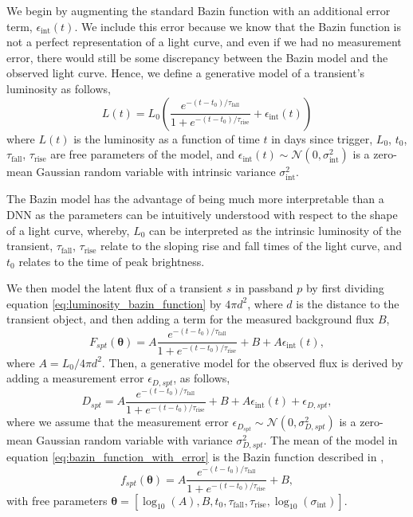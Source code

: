 \documentclass[fleqn,usenatbib]{mnras}
\begin{document}
We begin by augmenting the standard Bazin function with an additional error term, $\epsilon_{\mathrm{int}}(t)$. We include this error because we know that the Bazin function is not a perfect representation of a light curve, and even if we had no measurement error, there would still be some discrepancy between the Bazin model and the observed light curve. Hence, we define a generative model of a transient's luminosity as follows,
\begin{equation}
    L(t) = L_0 \left ( \frac{e^{-(t-t_0)/\tau_{\mathrm{fall}}}}{1 + e^{-(t-t_0)/\tau_{\mathrm{rise}}}} + \epsilon_{\mathrm{int}}(t) \right)
    \label{eq:luminosity_bazin_function}
\end{equation}
where $L(t)$ is the luminosity as a function of time $t$ in days since trigger, $L_0$, $t_0$, $\tau_{\mathrm{fall}}$, $\tau_{\mathrm{rise}}$ are free parameters of the model, and $\epsilon_{\mathrm{int}}(t) \sim \mathcal{N}(0,\sigma_{\mathrm{int}}^2)$ is a zero-mean Gaussian random variable with intrinsic variance $\sigma_{\mathrm{int}}^2$. 

The Bazin model has the advantage of being much more interpretable than a DNN as the parameters can be intuitively understood with respect to the shape of a light curve, whereby, $L_0$ can be interpreted as the intrinsic luminosity of the transient, $\tau_{\mathrm{fall}}$, $\tau_{\mathrm{rise}}$ relate to the sloping rise and fall times of the light curve, and $t_0$ relates to the time of peak brightness.

We then model the latent flux of a transient $s$ in passband $p$ by first dividing equation \ref{eq:luminosity_bazin_function} by $4\pi d^2$, where $d$ is the distance to the transient object, and then adding a term for the measured background flux $B$,
\begin{equation}
    F_{spt}(\bm{\theta}) = A \frac{e^{-(t-t_0)/\tau_{\mathrm{fall}}}}{1 + e^{-(t-t_0)/\tau_{\mathrm{rise}}}} + B + A\epsilon_{\mathrm{int}}(t),
\label{eq:bazin_function}
\end{equation}
where $A = L_0/4\pi d^2$. Then, a generative model for the observed flux is derived by adding a measurement error $\epsilon_{D,{spt}}$, as follows, 
\begin{equation}
    D_{spt} = A \frac{e^{-(t-t_0)/\tau_{\mathrm{fall}}}}{1 + e^{-(t-t_0)/\tau_{\mathrm{rise}}}} + B + A\epsilon_{\mathrm{int}}(t) + \epsilon_{D,{spt}},
\label{eq:bazin_function_with_error}
\end{equation}
where we assume that the measurement error $\epsilon_{D_{spt}} \sim \mathcal{N}(0,\sigma_{D,{spt}}^2)$ is a zero-mean Gaussian random variable with variance $\sigma_{D,{spt}}^2$. The mean of the model in equation \ref{eq:bazin_function_with_error} is the Bazin function described in \citet{Bazin_function},
\begin{equation}
    f_{spt}(\bm{\theta}) = A \frac{e^{-(t-t_0)/\tau_{\mathrm{fall}}}}{1 + e^{-(t-t_0)/\tau_{\mathrm{rise}}}} + B,
\label{eq:bazin_function_no_error}
\end{equation}
with free parameters $\bm{\theta} = [\log_{10}{(A)}, B, t_0, \tau_{\mathrm{fall}}, \tau_{\mathrm{rise}}, \log_{10}{(\sigma_{\mathrm{int}})}]$. 
\end{document}
